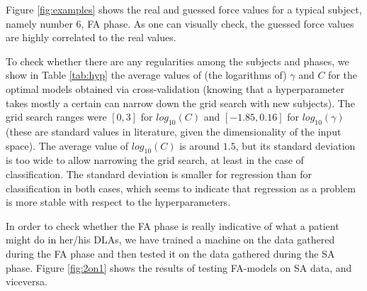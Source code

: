 \documentclass[10pt]{bmc_article}
\def\texttt{[image: ]}
\newenvironment{bmcformat}{\begin{raggedright}\baselineskip20pt\sloppy\setboolean{publ}{false}}{\end{raggedright}\baselineskip20pt\sloppy}
\begin{document}
\begin{bmcformat}
Figure \ref{fig:examples} shows the real and guessed force values for a
typical subject, namely number $6$, FA phase. As one can visually
check, the guessed force values are highly correlated to the real
values.


To check whether there are any regularities among the subjects and phases,
we show in Table \ref{tab:hyp} the average values of (the logarithms of)
$\gamma$ and $C$ for the optimal models obtained via cross-validation
(knowing that a hyperparameter takes mostly a certain can narrow down the
grid search with new subjects).
The grid search ranges were $[0,3]$ for $log_{10}(C)$ and
$[-1.85,0.16]$ for $log_{10}(\gamma)$ (these are standard values in
literature, given the dimensionality of the input space). The average value of
$log_{10}(C)$ is around $1.5$, but its standard deviation is too wide
to allow narrowing the grid search, at least in the case of
classification. The standard deviation is smaller for regression than
for classification in both cases, which seems to indicate that
regression as a problem is more stable with respect to the
hyperparameters.

In order to check whether the FA phase is really indicative of what
a patient might do in her/his DLAs, we have trained a
machine on the data gathered during the FA phase and then tested it
on the data gathered during the SA phase. Figure \ref{fig:2on1} shows the
results of testing FA-models on SA data, and viceversa.



\end{bmcformat}
\end{document}
